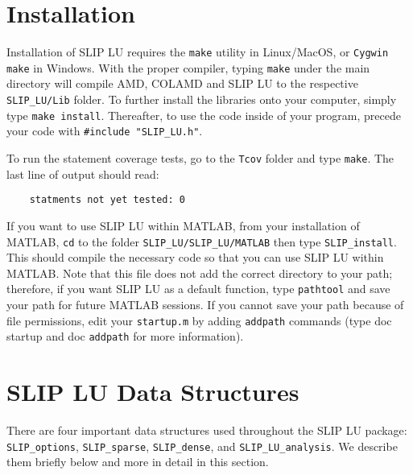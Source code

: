 \documentclass[12pt]{article}
\theoremstyle{definition}
\begin{document}
\section{Installation} \label{s:install}

Installation of SLIP LU requires the \verb|make| utility in Linux/MacOS, or
\verb|Cygwin make| in Windows. With the proper compiler, typing \verb|make|
under the main directory will compile AMD, COLAMD and SLIP LU to the respective
\verb'SLIP_LU/Lib' folder. To further install the libraries onto your computer,
simply type \verb|make install|.  Thereafter, to use the code inside of your
program, precede your code with \verb|#include "SLIP_LU.h"|.

To run the statement coverage tests, go to the \verb'Tcov' folder and
type \verb'make'.  The last line of output should read:

\begin{verbatim}
    statments not yet tested: 0
\end{verbatim}

If you want to use SLIP LU within MATLAB, from your installation of MATLAB,
\verb|cd| to the folder \verb|SLIP_LU/SLIP_LU/MATLAB| then type
\verb|SLIP_install|. This should compile the necessary code so that you can use
SLIP LU within MATLAB. Note that this file does not add the correct directory
to your path; therefore, if you want SLIP LU as a default function, type
\verb|pathtool| and save your path for future MATLAB sessions. If you cannot
save your path because of file permissions, edit your \verb|startup.m| by
adding \verb|addpath| commands (type doc startup and doc \verb|addpath| for
more information).

\section{SLIP LU Data Structures} \label{s:Structures}

There are four important data structures used throughout the SLIP LU package:
\verb|SLIP_options|, \verb|SLIP_sparse|, \verb|SLIP_dense|, and
\verb|SLIP_LU_analysis|. We describe them briefly below and more in detail in
this section.
\end{document}
